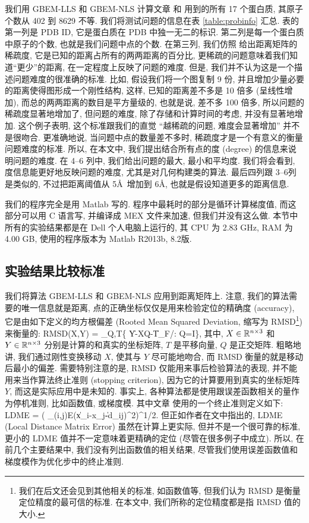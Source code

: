 \documentclass{CASthesis_zzk}
\begin{document}
我们用 GBEM-LLS 和 GBEM-NLS 计算文章 \cite{Biswas2008} 和 \cite{Sit2009}
用到的所有 17 个蛋白质, 其原子个数从 402 到 8629 不等. 
我们将测试问题的信息在表 \ref{table:probinfo} 汇总. 
表的第一列是 PDB ID, 它是蛋白质在 PDB 中独一无二的标识. 
第二列是每一个蛋白质中原子的个数, 也就是我们问题中点的个数. 
在第三列, 我们仿照 \cite{Biswas2008} 给出距离矩阵的稀疏度, 
它是已知的距离占所有的两两距离的百分比,
更稀疏的问题意味着我们知道``更少''的距离, 在一定程度上反映了问题的难度.
但是, 我们并不认为这是一个描述问题难度的很准确的标准.
比如, 假设我们将一个图复制 9 份, 并且增加少量必要的距离使得图形成一个刚性结构,
这样, 已知的距离差不多是 10 倍多 (呈线性增加), 
而总的两两距离的数目是平方量级的, 也就是说, 差不多 100 倍多, 
所以问题的稀疏度显著地增加了, 但问题的难度, 
除了存储和计算时间的考虑, 并没有显著地增加.
这个例子表明, 这个标准跟我们的直觉 \pozhe ``越稀疏的问题, 难度会显著增加''
并不是很吻合.
更准确地说, 当问题中点的数量差不多时, 稀疏度才是一个有意义的衡量问题难度的标准.
所以, 在本文中, 我们提出结合所有点的度 (degree) 的信息来说明问题的难度.
在 4--6 列中, 我们给出问题的最大, 最小和平均度.
我们将会看到, 度信息能更好地反映问题的难度, 尤其是对几何构建类的算法.
最后四列跟 3--6列是类似的, 不过把距离阈值从 5\AA ~增加到 6\AA,
也就是假设知道更多的距离信息.

我们的程序完全是用 Matlab 写的.
程序中最耗时的部分是循环计算梯度值, 
而这部分可以用 C 语言写, 并编译成 MEX 文件来加速,
但我们并没有这么做.
本节中所有的实验结果都是在 Dell 个人电脑上运行的,
其 CPU 为 2.83 GHz, RAM 为 4.00 GB, 
使用的程序版本为 Matlab R2013b, 8.2版.

\subsection{实验结果比较标准}
\label{sec:result}
我们将算法 GBEM-LLS 和 GBEM-NLS 应用到距离矩阵上.
注意, 我们的算法需要的唯一信息就是距离,
点的正确坐标仅仅是用来检验定位的精确度 (accuracy),
它是由如下定义的均方根偏差 (Rooted Mean Squared Deviation, 缩写为 RMSD\footnote{我们在后文还会见到其他相关的标准, 如函数值等, 但我们认为 RMSD 是衡量定位精度的最可信的标准. 在本文中, 我们所称的定位精度都是指 RMSD 值的大小.}) 来衡量的:
\be RMSD(X,Y) = \min_{Q,T}\{ \|Y-XQ-T\|_{F}/: Q=I\}, \ee
其中, $X\in \mathbb{R}^{n\times 3}$ 和 $Y\in \mathbb{R}^{n\times 3}$ 
分别是计算的和真实的坐标矩阵, 
$T$ 是平移向量, $Q$ 是正交矩阵.
粗略地讲, 我们通过刚性变换移动 $X$, 使其与 $Y$ 尽可能地吻合,
而 RMSD 衡量的就是移动后最小的偏差. 
需要特别注意的是, RMSD 仅能用来事后检验算法的表现,
并不能用来当作算法终止准则 (stopping criterion), 
因为它的计算要用到真实的坐标矩阵 $Y$,
而这是实际应用中是未知的.
事实上, 各种算法都是使用跟误差函数相关的量作为停机准则,
比如函数值, 或梯度模. 
其中文章 \cite{Biswas2008} 使用的一个终止准则定义如下:
\be LDME = \Big( \sum_{(i,j)\in E}\big(\|x_i-x_j\|-d_{ij}\big)^2\Big)^{1/2}. \ee
但正如作者在文中指出的, 
LDME (Local Distance Matrix Error) 虽然在计算上更实际, 
但并不是一个很可靠的标准, 
更小的 LDME 值并不一定意味着更精确的定位 (尽管在很多例子中成立).
所以, 在前几个主要结果中, 我们没有列出函数值的相关结果, 
尽管我们使用误差函数值和梯度模作为优化步中的终止准则.
\end{document}
